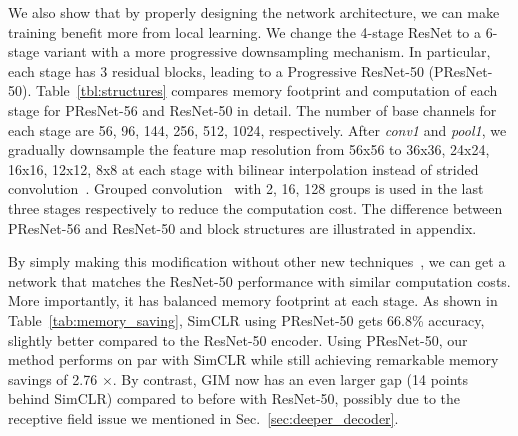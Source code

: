 We also show that by properly designing the network architecture, we can make training benefit more
from local learning. We change the 4-stage ResNet to a 6-stage variant with a more progressive
downsampling mechanism. In particular, each stage has 3 residual blocks, leading to a Progressive
ResNet-50 (PResNet-50). Table~\ref{tbl:structures} compares memory footprint and computation of each
stage for PResNet-56 and ResNet-50 in detail. The number of base channels for each stage are 56, 96,
144, 256, 512, 1024, respectively. After {\em conv1} and {\em pool1}, we gradually downsample the
feature map resolution from 56x56 to 36x36, 24x24, 16x16, 12x12, 8x8 at each stage with bilinear
interpolation instead of strided convolution~\cite{he2016deep}. Grouped convolution~\cite{alexnet}
with 2, 16, 128 groups is used in the last three stages respectively to reduce the computation cost.
The difference between PResNet-56 and ResNet-50 and block structures are illustrated in
 appendix.

By simply making this modification without other new techniques~\cite{he2019bag, hu2018squeeze,
li2019selective}, we can get a network that matches the ResNet-50 performance with similar
computation costs. More importantly, it has balanced memory footprint at each stage. As shown in
Table~\ref{tab:memory_saving}, SimCLR using PResNet-50 gets 66.8\% accuracy, slightly better
compared to the ResNet-50 encoder. Using PResNet-50, our method performs on par with SimCLR while
still achieving remarkable memory savings of 2.76 $\times$. By contrast, GIM now has an even larger
gap (14 points behind SimCLR) compared to before with ResNet-50, possibly due to the receptive field
issue we mentioned in Sec.~\ref{sec:deeper_decoder}.


